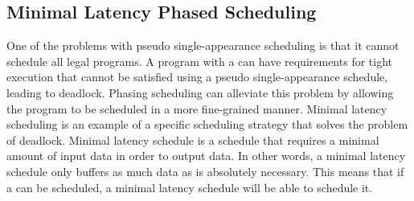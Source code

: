 \begin{comment}
One important observation to make is that it makes little sense to
have phases which do not consume or produce any data, and which do
not have data cross any latency boundaries.  This is because such
phases can easily be merged with preceding or following phases
without any effect on ability to schedule a particular program.
This observation allows to easily bound the size of the resulting
schedules to be the sum of executions of first child, last child
and children with latency boundaries. For example, the {\pipeline}
in Figure \ref{fig:hierarchical-schedule} executes its first
child, {\filter} A, 4 times in steady state execution, and its last
child, {\filter} D, 9 times. Thus a phasing schedule of this
pipeline should at most have $4+9=13$ phases.
\end{comment}

\subsection{Minimal Latency Phased Scheduling}
\label{sec:min-latency}

One of the problems with pseudo single-appearance scheduling is
that it cannot schedule all legal {\StreamIt} programs.  A program
with a {{\feedbackloop}} can have requirements for tight execution
that cannot be satisfied using a pseudo single-appearance
schedule, leading to deadlock. Phasing scheduling can alleviate
this problem by allowing the program to be scheduled in a more
fine-grained manner. Minimal latency scheduling is an example of a
specific scheduling strategy that solves the problem of deadlock.
Minimal latency schedule is a schedule that requires a minimal
amount of input data in order to output data. In other words, a
minimal latency schedule only buffers as much data as is
absolutely necessary. This means that if a {\feedbackloop} can be
scheduled, a minimal latency schedule will be able to schedule it.

